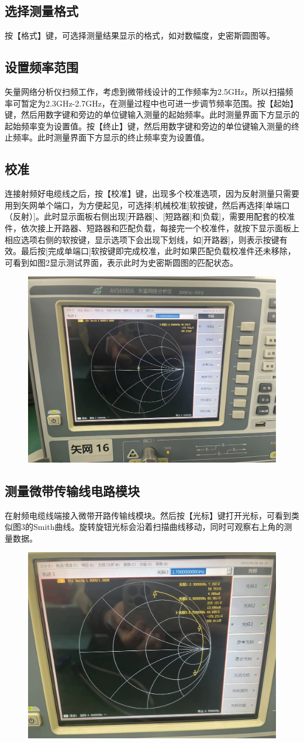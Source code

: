 \documentclass{source/Report}
\begin{document}
\subsection{选择测量格式}
按【格式】键，可选择测量结果显示的格式，如对数幅度，史密斯圆图等。
\subsection{设置频率范围}
矢量网络分析仪扫频工作，考虑到微带线设计的工作频率为2.5GHz，所以扫描频率可暂定为2.3GHz-2.7GHz，在测量过程中也可进一步调节频率范围。按【起始】键，然后用数字键和旁边的单位键输入测量的起始频率。此时测量界面下方显示的起始频率变为设置值。按【终止】键，然后用数字键和旁边的单位键输入测量的终止频率。此时测量界面下方显示的终止频率变为设置值。
\subsection{校准}
连接射频好电缆线之后，按【校准】键，出现多个校准选项，因为反射测量只需要用到矢网单个端口，为方便起见，可选择[机械校准]软按键，然后再选择[单端口（反射）]。此时显示面板右侧出现[开路器]、[短路器]和[负载]，需要用配套的校准件，依次接上开路器、短路器和匹配负载，每接完一个校准件，就按下显示面板上相应选项右侧的软按键，显示选项下会出现下划线，如[开路器]，则表示按键有效。最后按[完成单端口]软按键即完成校准，此时如果匹配负载校准件还未移除，可看到如图2显示测试界面，表示此时为史密斯圆图的匹配状态。
\begin{figure}[H]
    \begin{center}
        \includegraphics[width=0.4\linewidth]{pic/cb1_p2.jpg}
        \caption{}
    \end{center}
\end{figure}
\subsection{测量微带传输线电路模块}
在射频电缆线端接入微带开路传输线模块。然后按【光标】键打开光标，可看到类似图3的Smith曲线。旋转旋钮光标会沿着扫描曲线移动，同时可观察右上角的测量数据。
\begin{figure}[H]
    \begin{center}
        \includegraphics[width=0.4\linewidth]{pic/cb1_p3.jpg}
        \caption{}
    \end{center}
\end{figure}
\end{document}
